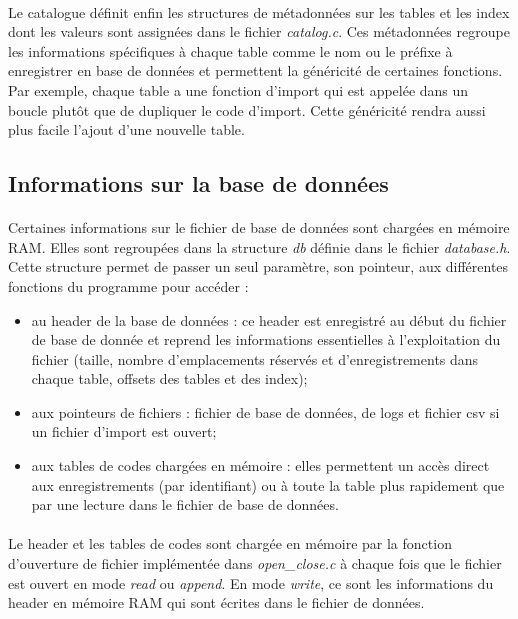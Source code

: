 \documentclass{article}
\begin{document}
    \paragraph{}
    Le catalogue définit enfin les structures de métadonnées sur les tables et les index dont les valeurs sont assignées dans le fichier \emph{catalog.c}. Ces métadonnées regroupe les informations spécifiques à chaque table comme le nom ou le préfixe à enregistrer en base de données et permettent la généricité de certaines fonctions. Par exemple, chaque table a une fonction d'import qui est appelée dans un boucle plutôt que de dupliquer le code d'import. Cette généricité rendra aussi plus facile l'ajout d'une nouvelle table.


    \subsection{Informations sur la base de données}
    \paragraph{}
    Certaines informations sur le fichier de base de données sont chargées en mémoire RAM. Elles sont regroupées dans la structure \emph{db} définie dans le fichier \emph{database.h}. Cette structure permet de passer un seul paramètre, son pointeur, aux différentes fonctions du programme pour accéder :
    \begin{itemize}[label=$\bullet$]
        \item au header de la base de données : ce header est enregistré au début du fichier de base de donnée et reprend les informations essentielles à l'exploitation du fichier (taille, nombre d'emplacements réservés et d'enregistrements dans chaque table, offsets des tables et des index);
        \item aux pointeurs de fichiers : fichier de base de données, de logs et fichier csv si un fichier d'import est ouvert;
        \item aux tables de codes chargées en mémoire : elles permettent un accès direct aux enregistrements (par identifiant) ou à toute la table plus rapidement que par une lecture dans le fichier de base de données.
    \end{itemize}

    \paragraph{}
    Le header et les tables de codes sont chargée en mémoire par la fonction d'ouverture de fichier implémentée dans \emph{open\_close.c} à chaque fois que le fichier est ouvert en mode \emph{read} ou \emph{append}. En mode \emph{write}, ce sont les informations du header en mémoire RAM qui sont écrites dans le fichier de données.
\end{document}
